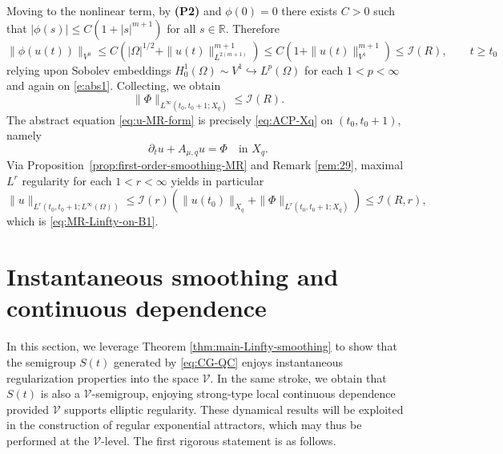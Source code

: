 \documentclass[12pt,leqno]{amsart}
\def\pt {{\partial_t}}
\theoremstyle{definition}
\numberwithin{equation}{section}
\numberwithin{figure}{section}
\begin{document}
Moving to the nonlinear term, by \textbf{(P2)} and $\phi(0)=0$ there exists $C>0$ such that
$|\phi(s)|\le C(1+|s|^{m+1})$ for all $s\in\mathbb R$. Therefore  
\[
\|\phi(u(t))\|_{V^0}
\le C\left(|\Omega|^{1/2}+\|u(t)\|_{L^{2(m+1)}}^{m+1}\right) \leq C\left(1+ \|u(t) \|_{V^1}^{m+1}\right) \leq \mathcal I(R), \qquad t \geq t_0
\]
relying upon Sobolev embeddings $H_0^1(\Omega) \sim {V^1}\hookrightarrow L^{p}(\Omega)$ for each   $1<p<\infty$ and again on \eqref{e:abs1}.
Collecting, we obtain
\begin{equation}\label{eq:Phi-Xq-bound}
\|\Phi\|_{L^\infty(t_0,t_0+1;X_q)}\le  \mathcal I(R).
\end{equation}
The abstract equation \eqref{eq:u-MR-form} is precisely \eqref{eq:ACP-Xq} on $(t_0,t_0+1)$, namely
\[
\pt u + A_{\mu,q}u=\Phi \quad \text{in }X_q.
\]
Via Proposition~\ref{prop:first-order-smoothing-MR} and Remark \ref{rem:29}, maximal $L^r$ regularity for each $1<r<\infty$ yields in particular 
\[
\|u\|_{L^r(t_0,t_0+1;L^\infty(\Omega))}
\le \mathcal I(r)\left(\|u(t_0)\|_{X_q}+\|\Phi\|_{L^r(t_0,t_0+1;X_q)}\right)
\le \mathcal I(R,r),
\]
which is \eqref{eq:MR-Linfty-on-B1}.
  
  
\section{Instantaneous smoothing and continuous dependence}\label{sec:aux-Vp}
In this section, we leverage Theorem \ref{thm:main-Linfty-smoothing} to show that the semigroup  $S(t) $ generated by \eqref{eq:CG-QC} enjoys instantaneous regularization properties into the space $\mathcal V$. In the same stroke, we   obtain that $S(t) $ is  also a $\mathcal V$-semigroup, enjoying strong-type local continuous dependence provided $\mathcal V$ supports elliptic regularity. These dynamical results will be exploited in the construction of regular exponential attractors, which may thus be performed  at the $\mathcal V$-level.  The first rigorous statement is as follows.
\end{document}
